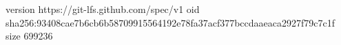 version https://git-lfs.github.com/spec/v1
oid sha256:93408cae7b6cb6b58709915564192e78fa37acf377bccdaaeaca2927f79c7c1f
size 699236
